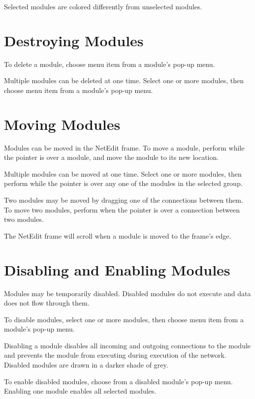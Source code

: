 Selected modules are colored differently from unselected modules.

\section{Destroying Modules}
\label{sec:destroymod}

To delete a module, choose menu item  from a module's
pop-up menu.

Multiple modules can be deleted at one time. Select one or more
modules, then choose menu item  from a
module's pop-up menu.

\section{Moving Modules}
\label{sec:movemod}

Modules can be moved in the NetEdit frame.  To move a module, perform
 while the pointer is over a module, and move the module
to its new location.

Multiple modules can be moved at one time.  Select one or more
modules, then perform  while the pointer is over any one
of the modules in the selected group.

Two modules may be moved by dragging one of the connections between
them.  To move two modules, perform  when the
pointer is over a connection between two modules.

The NetEdit frame will scroll when a module is moved to the frame's edge.

\section{Disabling and Enabling Modules}
\label{sec:disablemod}

Modules may be temporarily disabled.  Disabled modules do not execute
and data does not flow through them.

To disable modules, select one or more modules, then
choose menu item  from a module's pop-up menu.

Disabling a module disables all incoming and outgoing connections to
the module and prevents the module from executing during execution of
the network. Disabled modules are drawn in a darker shade of grey.

To enable disabled modules, choose  from a disabled
module's pop-up menu.  Enabling one module enables all selected modules.

